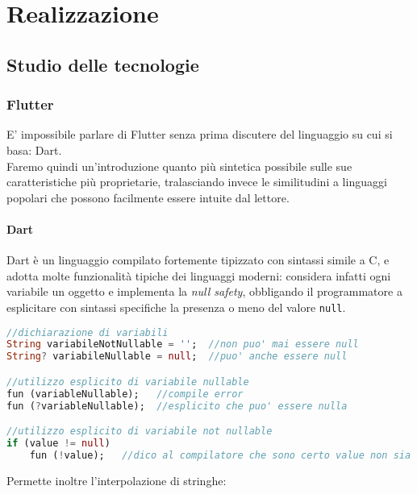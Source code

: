 
\chapter{Realizzazione}
\label{cap:realizzazione}



\section{Studio delle tecnologie}
\subsection{Flutter}
E' impossibile parlare di Flutter senza prima discutere del linguaggio su cui si basa: Dart.\\
Faremo quindi un'introduzione quanto più sintetica possibile sulle sue caratteristiche più proprietarie, tralasciando invece le similitudini a linguaggi popolari che possono facilmente essere intuite dal lettore.
\subsubsection{Dart}
Dart è un linguaggio compilato fortemente tipizzato con sintassi simile a C, e adotta molte funzionalità tipiche dei linguaggi moderni: considera infatti ogni variabile un oggetto e implementa la \textit{null safety}, obbligando il programmatore a esplicitare con sintassi specifiche la presenza o meno del valore \verb+null+.

\begin{lstlisting}[language=dart, firstnumber=1,caption={Dart \textit{null safety}}]
//dichiarazione di variabili
String variabileNotNullable = '';  //non puo' mai essere null
String? variabileNullable = null;  //puo' anche essere null

//utilizzo esplicito di variabile nullable
fun (variableNullable);   //compile error
fun (?variableNullable);  //esplicito che puo' essere nulla

//utilizzo esplicito di variabile not nullable
if (value != null)
    fun (!value);   //dico al compilatore che sono certo value non sia null
\end{lstlisting} 

Permette inoltre l'interpolazione di stringhe:

